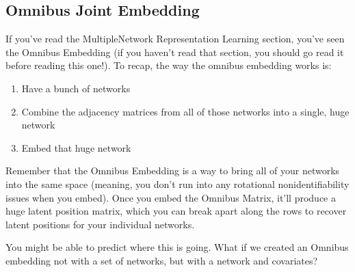 \documentclass[letterpaper,10pt,english]{jupyterBook}
\begin{document}
\subsection{Omnibus Joint Embedding}
\label{\detokenize{representations/ch6/joint-representation-learning:omnibus-joint-embedding}}
\sphinxAtStartPar
If you’ve read the Multiple\sphinxhyphen{}Network Representation Learning section, you’ve seen the Omnibus Embedding (if you haven’t read that section, you should go read it before reading this one!). To recap, the way the omnibus embedding works is:
\begin{enumerate}
%
\item {} 
\sphinxAtStartPar
Have a bunch of networks

\item {} 
\sphinxAtStartPar
Combine the adjacency matrices from all of those networks into a single, huge network

\item {} 
\sphinxAtStartPar
Embed that huge network

\end{enumerate}

\sphinxAtStartPar
Remember that the Omnibus Embedding is a way to bring all of your networks into the same space (meaning, you don’t run into any rotational nonidentifiability issues when you embed). Once you embed the Omnibus Matrix, it’ll produce a huge latent position matrix, which you can break apart along the rows to recover latent positions for your individual networks.

\sphinxAtStartPar
You might be able to predict where this is going. What if we created an Omnibus embedding not with a set of networks, but with a network and covariates?

\begin{sphinxVerbatim}[commandchars=\\\{\}]
   

  

  
  

  \PYG{p}{[} \PYG{p}{]}
\end{sphinxVerbatim}
\end{document}
